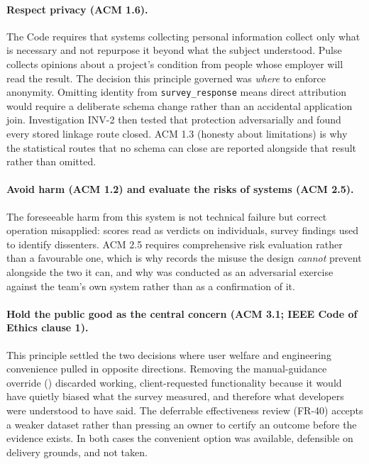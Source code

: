 \paragraph{Respect privacy (ACM 1.6).} The Code requires that systems collecting
personal information collect only what is necessary and not repurpose it beyond
what the subject understood. Pulse collects opinions about a project's condition
from people whose employer will read the result. The decision this principle
governed was \emph{where} to enforce anonymity. Omitting identity from
\texttt{survey\_response} means direct attribution would require a deliberate
schema change rather than an accidental application join. Investigation INV-2
then tested that protection adversarially and found every stored linkage route
closed. ACM 1.3 (honesty about limitations) is why the statistical routes that
no schema can close are reported alongside that result rather than omitted.

\paragraph{Avoid harm (ACM 1.2) and evaluate the risks of systems (ACM 2.5).}
The foreseeable harm from this system is not technical failure but correct
operation misapplied: scores read as verdicts on individuals, survey findings
used to identify dissenters. ACM 2.5 requires comprehensive risk evaluation
rather than a favourable one, which is why  records the misuse
the design \emph{cannot} prevent alongside the two it can, and why
 was conducted as an adversarial exercise against the team's
own system rather than as a confirmation of it.

\paragraph{Hold the public good as the central concern (ACM 3.1; IEEE Code of
Ethics clause 1).} This principle settled the two decisions where user welfare
and engineering convenience pulled in opposite directions. Removing the
manual-guidance override () discarded working,
client-requested functionality because it would have quietly biased what the
survey measured, and therefore what developers were understood to have said. The
deferrable effectiveness review (FR-40) accepts a weaker dataset rather than
pressing an owner to certify an outcome before the evidence exists. In both
cases the convenient option was available, defensible on delivery grounds, and
not taken.

